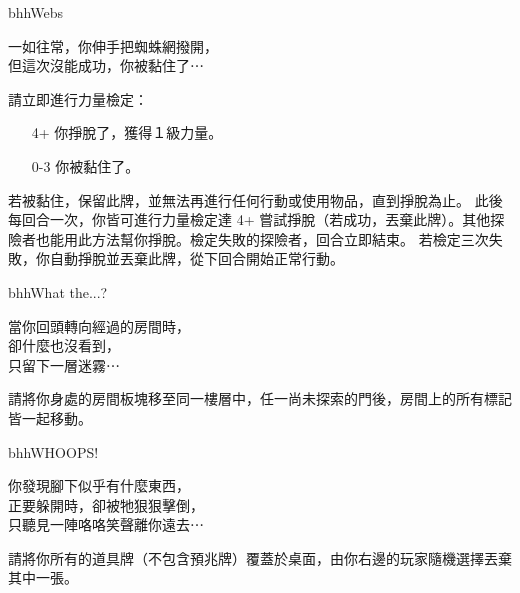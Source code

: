 \linebreak[0]%
\begin{EventCard}{bhh}{Webs}
  \begin{CardStory}
    一如往常，你伸手把蜘蛛網撥開，\\
    但這次沒能成功，你被黏住了⋯
  \end{CardStory}
  請立即進行力量檢定：
  \begin{itemize}
    \item[4+] 你掙脫了，獲得１級力量。
    \item[0-3] 你被黏住了。
  \end{itemize}
  若被黏住，保留此牌，並無法再進行任何行動或使用物品，直到掙脫為止。\smallbreak
  此後每回合一次，你皆可進行力量檢定達 4+ 嘗試掙脫（若成功，丟棄此牌）。其他探險者也能用此方法幫你掙脫。檢定失敗的探險者，回合立即結束。\smallbreak
  若檢定三次失敗，你自動掙脫並丟棄此牌，從下回合開始正常行動。\smallbreak
\end{EventCard}%
\linebreak[0]%
\begin{EventCard}{bhh}{What the...?}
  \begin{CardStory}
    當你回頭轉向經過的房間時，\\
    卻什麼也沒看到，\\
    只留下一層迷霧⋯
  \end{CardStory}
 請將你身處的房間板塊移至同一樓層中，任一尚未探索的門後，房間上的所有標記皆一起移動。\smallbreak
\end{EventCard}%
\linebreak[0]%
\begin{EventCard}{bhh}{WHOOPS!}
  \begin{CardStory}
    你發現腳下似乎有什麼東西，\\
    正要躲開時，卻被牠狠狠擊倒，\\
    只聽見一陣咯咯笑聲離你遠去⋯
  \end{CardStory}
 請將你所有的道具牌（不包含預兆牌）覆蓋於桌面，由你右邊的玩家隨機選擇丟棄其中一張。\smallbreak
\end{EventCard}%
\linebreak[0]%
